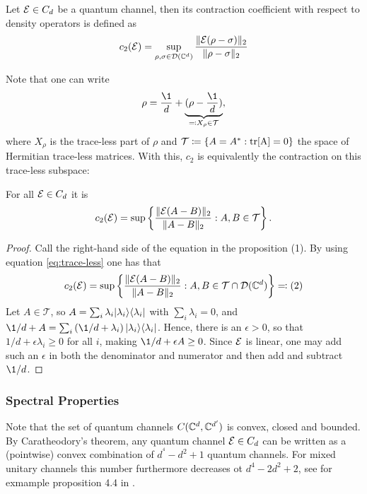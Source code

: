 \begin{definition}
    Let $\mathcal E \in C_d$ be a quantum channel, then its contraction coefficient with respect to density operators is defined as 
    \begin{align*}
        c_2(\mathcal E) = \sup_{\rho,\sigma \in \mathcal D(\mathbb{C}^d)}\frac{\lVert\mathcal E(\rho - \sigma)\rVert_2}{\lVert\rho - \sigma\rVert_2}
    \end{align*}
\end{definition}
Note that one can write
\begin{align}
    \rho = \frac{\1}{d}+\underbrace{(\rho-\frac{\1}{d})}_{\eqqcolon X_\rho \in \m T},\label{eq:trace-less}
\end{align}
where $X_\rho$ is the trace-less part of $\rho$ and $\mathcal T\coloneqq \{A=A^*:\mathrm{tr[A]} = 0\}$ the space of Hermitian trace-less matrices. With this, $c_2$ is equivalently the contraction on this trace-less subspace:
\begin{prop}\label{prop:contraction-traceless}
    For all $\mathcal E \in C_d$ it is 
    \begin{align*}
        c_2(\mathcal E) = \sup\left\{ \frac{\lVert\mathcal E(A-B)\rVert_2}{\lVert A-B\rVert_2}: A,B \in \mathcal T\right\}.
    \end{align*}
\end{prop}
\begin{proof}
    Call the right-hand side of the equation in the proposition (1). By using equation \eqref{eq:trace-less} one has that 
    \begin{align*}
        c_2(\mathcal E) = \sup\left\{ \frac{\lVert\mathcal E(A-B)\rVert_2}{\lVert A-B\rVert_2}: A,B \in \mathcal T\cap \mathcal D(\mathbb{C}^d)\right\}\eqqcolon (2)
    \end{align*}
     Let $A \in \mathcal{{T}}$, so $A = \sum_i \lambda_i \lvert\lambda_i\rangle\langle\lambda_i\rvert $ with $\sum_i \lambda_i = 0$, and $\1/d+ A = \sum_i \left( \1/d + \lambda_i \right) \pr{\lambda_i}$. Hence, there is an $\epsilon > 0$, so that $1/d + \epsilon \lambda_i\geq 0$ for all $i$, making $\1/d + \epsilon A \geq 0$. Since $\mathcal E$ is linear, one may add such an $\epsilon$ in both the denominator and numerator and then add and subtract $\1/d$.
\end{proof}


\subsubsection{Spectral Properties}
Note that the set of quantum channels $C (\mathbb{C}^d, \mathbb{C}^{d'})$ is convex, closed and bounded. By Caratheodory's theorem, any quantum channel $\mathcal E \in C_d$ can be written as a (pointwise) convex combination of $d^^4 - d^2 +1$ quantum channels. For mixed unitary channels this number furthermore decreases ot $d^4-2d^2+2$, see for exmample proposition 4.4 in \cite{watrousTheoryQuantumInformation2018}.

